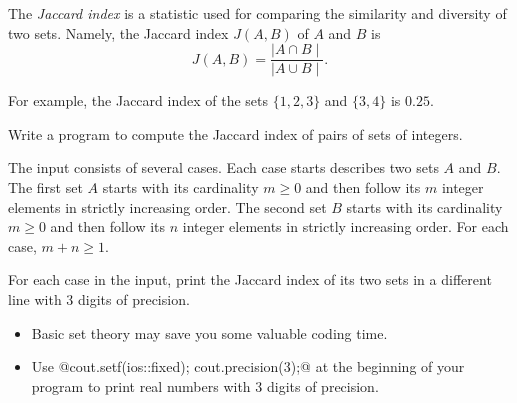 

\Statement

The \emph{Jaccard index} is a statistic used for comparing the similarity and
diversity of two sets. Namely, the Jaccard index $J(A,B)$ of $A$ and $B$
is \[ J(A,B) = \frac{\mid A\cap B\mid }{\mid A\cup B\mid }. \]

For example, the Jaccard index of
the sets $\{1,2,3\}$ and $\{3,4\}$ is $0.25$.

\medskip

Write a program to compute the Jaccard index of pairs of sets
of integers.

\Input

The input consists of several cases.
Each case starts describes two sets $A$ and $B$.
The first set $A$ starts with its cardinality $m \geq 0$
and then follow its $m$ integer elements in strictly increasing order.
The second set $B$ starts with its cardinality $m \geq 0$
and then follow its $n$ integer elements in strictly increasing order.
For each case, $m+n\ge1$.

\Output

For each case in the input, print the Jaccard index
of its two sets in a different line with 3 digits of precision.

\Hint

\begin{itemize}

\item Basic set theory may save you some valuable coding time.

\item Use @cout.setf(ios::fixed); cout.precision(3);@ at the beginning of your
program  to print real numbers with 3 digits of precision.

\end{itemize}
\smallskip

\Sample

